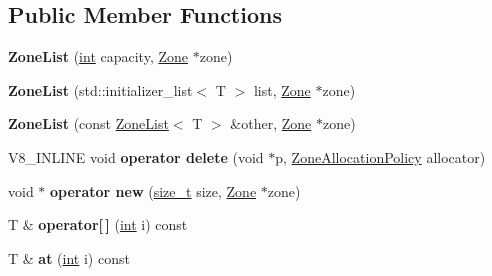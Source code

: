 \subsection*{Public Member Functions}
\begin{DoxyCompactItemize}
\item 
\mbox{\label{classv8_1_1internal_1_1ZoneList_af1f7621b6c2be40916af5fc5a46ce517}} 
{\bfseries Zone\+List} (\mbox{\hyperlink{classint}{int}} capacity, \mbox{\hyperlink{classv8_1_1internal_1_1Zone}{Zone}} $\ast$zone)
\item 
\mbox{\label{classv8_1_1internal_1_1ZoneList_a0c9f0cf394b32080ae7db834d007d930}} 
{\bfseries Zone\+List} (std\+::initializer\+\_\+list$<$ T $>$ list, \mbox{\hyperlink{classv8_1_1internal_1_1Zone}{Zone}} $\ast$zone)
\item 
\mbox{\label{classv8_1_1internal_1_1ZoneList_adebcf6abb4a1df45ad36a8dadc8be12b}} 
{\bfseries Zone\+List} (const \mbox{\hyperlink{classv8_1_1internal_1_1ZoneList}{Zone\+List}}$<$ T $>$ \&other, \mbox{\hyperlink{classv8_1_1internal_1_1Zone}{Zone}} $\ast$zone)
\item 
\mbox{\label{classv8_1_1internal_1_1ZoneList_a1724773fcb43343199036c4ac97a1816}} 
V8\+\_\+\+I\+N\+L\+I\+NE void {\bfseries operator delete} (void $\ast$p, \mbox{\hyperlink{classv8_1_1internal_1_1ZoneAllocationPolicy}{Zone\+Allocation\+Policy}} allocator)
\item 
\mbox{\label{classv8_1_1internal_1_1ZoneList_a957293196cdba1ac253cf42a7075bb7e}} 
void $\ast$ {\bfseries operator new} (\mbox{\hyperlink{classsize__t}{size\+\_\+t}} size, \mbox{\hyperlink{classv8_1_1internal_1_1Zone}{Zone}} $\ast$zone)
\item 
\mbox{\label{classv8_1_1internal_1_1ZoneList_a747da341048f1b76f3e57bcb695a8851}} 
T \& {\bfseries operator\mbox{[}$\,$\mbox{]}} (\mbox{\hyperlink{classint}{int}} i) const
\item 
\mbox{\label{classv8_1_1internal_1_1ZoneList_ae9cba02ea54bb13759dd07145f6b4521}} 
T \& {\bfseries at} (\mbox{\hyperlink{classint}{int}} i) const

\end{DoxyCompactItemize}

